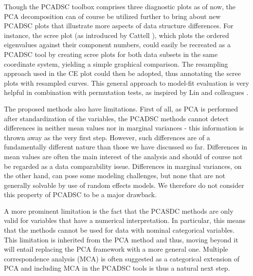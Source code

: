 \documentclass[]{interact}
\theoremstyle{plain}%
\theoremstyle{definition}
\theoremstyle{remark}
\begin{document}
Though the PCADSC toolbox comprises three diagnostic plots as of now, the PCA decomposition can of course be utilized further to bring about new PCADSC plots that illustrate more aspects of data structure differences. For instance, the scree plot (as introduced by Cattell \cite{Cattell1966}), which plots the ordered eigenvalues against their component numbers, could easily be recreated as a PCADSC tool by creating scree plots for both data subsets in the same coordinate system, yielding a simple graphical comparison. The resampling approach used in the CE plot could then be adopted, thus annotating the scree plots with resampled curves. This general approach to model-fit evaluation is very helpful in combination with permutation tests, as inspired by Lin and colleagues \cite{LinEtAl2002}. 


The proposed methods also have limitations. First of all, as PCA is performed after standardization of the variables, the PCADSC methods cannot detect differences in neither mean values nor in marginal variances - this information is thrown away as the very first step. However, such differences are of a fundamentally different nature than those we have discussed so far. Differences in mean values are often the main interest of the analysis and should of course not be regarded as a data comparability issue. Differences in marginal variances, on the other hand, can pose some modeling challenges, but none that are not generally solvable by use of random effects models. We therefore do not consider this property of PCADSC to be a major drawback.

A more prominent limitation is the fact that the PCASDC methods are only valid for variables that have a numerical interpretation. In particular, this means that the methods cannot be used for data with nominal categorical variables. This limitation is inherited from the PCA method and thus, moving beyond it will entail replacing the PCA framework with a more general one. Multiple correspondence analysis (MCA) is often suggested as a categorical extension of PCA \cite{Abdi2010} and including MCA in the PCADSC tools is thus a natural next step.
\end{document}
